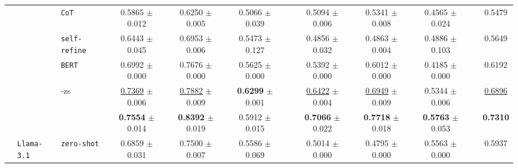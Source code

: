 \begin{table}[ht]
\begin{adjustbox}{max width=\textwidth}
\begin{tabular}{@{}l l l ccc p{0.15cm} ccc p{0.15cm} c@{}}
        & & \cellcolor{white} \texttt{CoT}                    & \cellcolor{white} 0.5865 {\tiny$\pm$ 0.012} & \cellcolor{white} 0.6250 {\tiny$\pm$ 0.005} & \cellcolor{white} 0.5066 {\tiny$\pm$ 0.039}  & & \cellcolor{white} 0.5094 {\tiny$\pm$ 0.006} & \cellcolor{white} 0.5341 {\tiny$\pm$ 0.008} & \cellcolor{white} 0.4565 {\tiny$\pm$ 0.024}  & & \cellcolor{avgall!85}0.5479 \\
        & & \cellcolor{altrow} \texttt{self-refine}            & \cellcolor{altrow} 0.6443 {\tiny$\pm$ 0.045} & \cellcolor{altrow} 0.6953 {\tiny$\pm$ 0.006} & \cellcolor{altrow} 0.5473 {\tiny$\pm$ 0.127}  & & \cellcolor{altrow} 0.4856 {\tiny$\pm$ 0.032} & \cellcolor{altrow} 0.4863 {\tiny$\pm$ 0.004} & \cellcolor{altrow} 0.4886 {\tiny$\pm$ 0.103}  & & \cellcolor{avgall!85}0.5649 \\
        & & \cellcolor{white} \texttt{BERT}                   & \cellcolor{white} 0.6992 {\tiny$\pm$ 0.000} & \cellcolor{white} 0.7676 {\tiny$\pm$ 0.000} & \cellcolor{white} 0.5625 {\tiny$\pm$ 0.000}  & & \cellcolor{white} 0.5392 {\tiny$\pm$ 0.000} & \cellcolor{white} 0.6012 {\tiny$\pm$ 0.000} & \cellcolor{white} 0.4185 {\tiny$\pm$ 0.000}  & & \cellcolor{avgall!85}0.6192 \\
        & & \cellcolor{methodrow} \method{}-zs          & \cellcolor{methodrow} \underline{0.7369} {\tiny$\pm$ 0.006} & \cellcolor{methodrow} \underline{0.7882} {\tiny$\pm$ 0.009} & \cellcolor{methodrow} \textbf{0.6299} {\tiny$\pm$ 0.001}  & & \cellcolor{methodrow} \underline{0.6422} {\tiny$\pm$ 0.004} & \cellcolor{methodrow} \underline{0.6949} {\tiny$\pm$ 0.009} & \cellcolor{methodrow} 0.5344 {\tiny$\pm$ 0.006}  & & \cellcolor{avgall!85}\underline{0.6896} \\
        & & \cellcolor{methodrow} \method{}                    & \cellcolor{methodrow} \textbf{0.7554} {\tiny$\pm$ 0.014} & \cellcolor{methodrow} \textbf{0.8392} {\tiny$\pm$ 0.019} & \cellcolor{methodrow} 0.5912 {\tiny$\pm$ 0.015}  & & \cellcolor{methodrow} \textbf{0.7066} {\tiny$\pm$ 0.022} & \cellcolor{methodrow} \textbf{0.7718} {\tiny$\pm$ 0.018} & \cellcolor{methodrow} \textbf{0.5763} {\tiny$\pm$ 0.053}  & & \cellcolor{avgall!85}\textbf{0.7310} \\
        \cmidrule(lr){2-10}
        & \multirow{7}{*}{\texttt{Llama-3.1}}
          & \cellcolor{white} \texttt{zero-shot}               & \cellcolor{white} 0.6859 {\tiny$\pm$ 0.031} & \cellcolor{white} 0.7500 {\tiny$\pm$ 0.007} & \cellcolor{white} 0.5586 {\tiny$\pm$ 0.069}  & & \cellcolor{white} 0.5014 {\tiny$\pm$ 0.000} & \cellcolor{white} 0.4795 {\tiny$\pm$ 0.000} & \cellcolor{white} 0.5563 {\tiny$\pm$ 0.000}  & & \cellcolor{avgall!85}0.5937 \\

\end{tabular}
\end{adjustbox}
\end{table}
